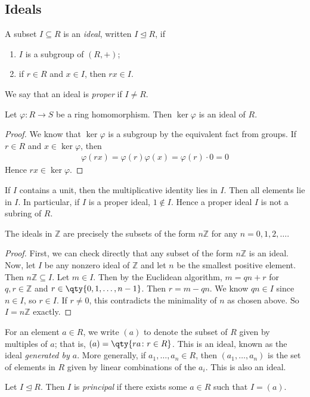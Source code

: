 \subsection{Ideals}
\begin{definition}
	A subset $I \subseteq R$ is an \textit{ideal}, written $I \trianglelefteq R$, if
	\begin{enumerate}
		\item $I$ is a subgroup of $(R, +)$;
		\item if $r \in R$ and $x \in I$, then $rx \in I$.
	\end{enumerate}
	We say that an ideal is \textit{proper} if $I \neq R$.
\end{definition}
\begin{lemma}
	Let $\varphi \colon R \to S$ be a ring homomorphism.
	Then $\ker \varphi$ is an ideal of $R$.
\end{lemma}
\begin{proof}
	We know that $\ker \varphi$ is a subgroup by the equivalent fact from groups.
	If $r \in R$ and $x \in \ker \varphi$, then
	\begin{align*}
		\varphi(rx) = \varphi(r) \varphi(x) = \varphi(r) \cdot 0 = 0
	\end{align*}
	Hence $rx \in \ker \varphi$.
\end{proof}
\begin{remark}
	If $I$ contains a unit, then the multiplicative identity lies in $I$.
	Then all elements lie in $I$.
	In particular, if $I$ is a proper ideal, $1 \not\in I$.
	Hence a proper ideal $I$ is not a subring of $R$.
\end{remark}
\begin{lemma}
	The ideals in $\mathbb Z$ are precisely the subsets of the form $n\mathbb Z$ for any $n = 0, 1, 2, \dots$.
\end{lemma}
\begin{proof}
	First, we can check directly that any subset of the form $n\mathbb Z$ is an ideal.
	Now, let $I$ be any nonzero ideal of $\mathbb Z$ and let $n$ be the smallest positive element.
	Then $n\mathbb Z \subseteq I$.
	Let $m \in I$.
	Then by the Euclidean algorithm, $m = qn+r$ for $q,r \in \mathbb Z$ and $r \in \qty{0, 1, \dots, n-1}$.
	Then $r = m - qn$.
	We know $qn \in I$ since $n \in I$, so $r \in I$.
	If $r \neq 0$, this contradicts the minimality of $n$ as chosen above.
	So $I = n\mathbb Z$ exactly.
\end{proof}
\begin{definition}
	For an element $a \in R$, we write $(a)$ to denote the subset of $R$ given by multiples of $a$; that is, $(a) = \qty{ra \colon r\in R}$.
	This is an ideal, known as the ideal \textit{generated by $a$}.
	More generally, if $a_1, \dots, a_n \in R$, then $(a_1, \dots, a_n)$ is the set of elements in $R$ given by linear combinations of the $a_i$.
	This is also an ideal.
\end{definition}
\begin{definition}
	Let $I \trianglelefteq R$.
	Then $I$ is \textit{principal} if there exists some $a \in R$ such that $I = (a)$.
\end{definition}

